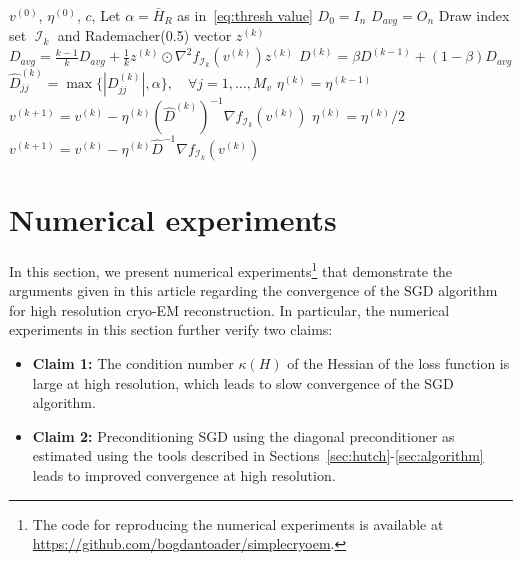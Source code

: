 \documentclass{article}
\DeclareMathOperator{\Ic}{\mathcal{I}}
\begin{document}
\begin{algorithm}[h]
    \caption{}
    \label{alg:precon sgd}
    \begin{algorithmic}[1]
        \Require $v^{(0)}$, $\eta^{(0)}$, $c$,
        \State Let $\alpha = \bar{H}_R$ as in~\eqref{eq:thresh value}
        \State $D_0 = I_n $
        \State $D_{avg} = O_n$ 
            \State Draw index set $\Ic_k$ and Rademacher(0.5) vector $z^{(k)}$
            \State $D_{avg} = \frac{k-1}{k} D_{avg} + \frac{1}{k} z^{(k)} \odot \nabla^2 f_{\Ic_k}(v^{(k)}) z^{(k)}$ 
            \State $D^{(k)} = \beta D^{(k-1)} + (1-\beta) D_{avg}$
            \State $\hat{D}^{(k)}_{jj} = \max\{|D^{(k)}_{jj}|, \alpha\}, 
                \quad \forall j=1,\ldots,M_v$
            \State $\eta^{(k)} = \eta^{(k-1)}$
            \State $v^{(k+1)} = v^{(k)} - \eta^{(k)} (\hat{D}^{(k)})^{-1} \nabla f_{\Ic_k}(v^{(k)})$
            \While{$f_{\Ic_k}(v^{(k+1)}) > f_{\Ic_k}(v^{(k)}) - c \cdot \eta^{(k)} \|\nabla f_{\Ic_k}(v^{(k)})  \|^2_{{(\hat{D}^{(k)})}^{-1}} $}
                \State $\eta^{(k)} = \eta^{(k)} / 2$
                \State $v^{(k+1)} = v^{(k)} - \eta^{(k)} \hat{D}^{-1} \nabla f_{\Ic_k}(v^{(k)})$
            \EndWhile
        \EndFor 
    \end{algorithmic}
\end{algorithm}



\section{Numerical experiments}
\label{sec:experiments}

In this section, we present numerical experiments\footnote{
    The code for reproducing the numerical experiments is available at \\
    \url{https://github.com/bogdantoader/simplecryoem}.
} that demonstrate the arguments
given in this article regarding the convergence of the SGD algorithm for 
high resolution cryo-EM reconstruction. In particular, the numerical experiments
in this section further verify two claims:

\begin{itemize}
    \item\textbf{Claim 1:} The condition number $\kappa(H)$ of the Hessian of the
        loss function is large at high resolution, which leads to slow convergence
        of the SGD algorithm.

    \item\textbf{Claim 2:} Preconditioning SGD using the diagonal preconditioner as 
        estimated using the tools described in Sections~\ref{sec:hutch}-\ref{sec:algorithm}
        leads to improved convergence at high resolution.
\end{itemize}
\end{document}
